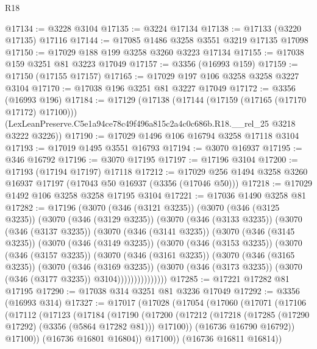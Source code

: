 \begin{lexlean}{R18}
\begin{coremodule}
@17134 := @3228 @3104
@17135 := @3224 @17134
@17138 := @17133 (@3220 @17135) @17116
@17144 := @17085 @1486 @3258 @3551 @3219 @17135 @17098
@17150 := @17029 @188 @199 @3258 @3260 @3223 @17134
@17155 := @17038 @159 @3251 @81 @3223 @17049
@17157 := @3356 (@16993 @159)
@17159 := @17150 (@17155 @17157)
@17165 := @17029 @197 @106 @3258 @3258 @3227 @3104
@17170 := @17038 @196 @3251 @81 @3227 @17049
@17172 := @3356 (@16993 @196)
@17184 := @17129
    (@17138
      (@17144 (@17159 (@17165 (@17170 @17172) @17100)))
      (LexLeanPreserve.C5e1a94ce78c49f496a815c2a4c0c686b.R18.__rel_25 @3218 @3222 @3226))
@17190 := @17029 @1496 @106 @16794 @3258 @17118 @3104
@17193 := @17019 @1495 @3551 @16793
@17194 := @3070 @16937
@17195 := @346 @16792
@17196 := @3070 @17195
@17197 := @17196 @3104
@17200 := @17193 (@17194 @17197) @17118
@17212 := @17029 @256 @1494 @3258 @3260 @16937 @17197 (@17043 @50 @16937 (@3356 (@17046 @50)))
@17218 := @17029 @1492 @106 @3258 @3258 @17195 @3104
@17221 := @17036 @1490 @3258 @81
@17282 := @17196
    (@3070
      (@346 (@3121 @3235))
      (@3070
        (@346 (@3125 @3235))
        (@3070
          (@346 (@3129 @3235))
          (@3070
            (@346 (@3133 @3235))
            (@3070
              (@346 (@3137 @3235))
              (@3070
                (@346 (@3141 @3235))
                (@3070
                  (@346 (@3145 @3235))
                  (@3070
                    (@346 (@3149 @3235))
                    (@3070
                      (@346 (@3153 @3235))
                      (@3070
                        (@346 (@3157 @3235))
                        (@3070
                          (@346 (@3161 @3235))
                          (@3070
                            (@346 (@3165 @3235))
                            (@3070
                              (@346 (@3169 @3235))
                              (@3070
                                (@346 (@3173 @3235))
                                (@3070 (@346 (@3177 @3235)) @3104)))))))))))))))
@17285 := @17221 @17282 @81 @17195
@17290 := @17038 @314 @3251 @81 @3236 @17049
@17292 := @3356 (@16993 @314)
@17327 := @17017
    (@17028
      (@17054
        (@17060
          (@17071
            (@17106
              (@17112
                (@17123
                  (@17184
                    (@17190
                      (@17200
                        (@17212 (@17218 (@17285 (@17290 @17292) (@3356 (@5864 @17282 @81))) @17100))
                        (@16736 @16790 @16792))
                      @17100))
                  (@16736 @16801 @16804))
                @17100))
            (@16736 @16811 @16814))

\end{coremodule}
\end{lexlean}
